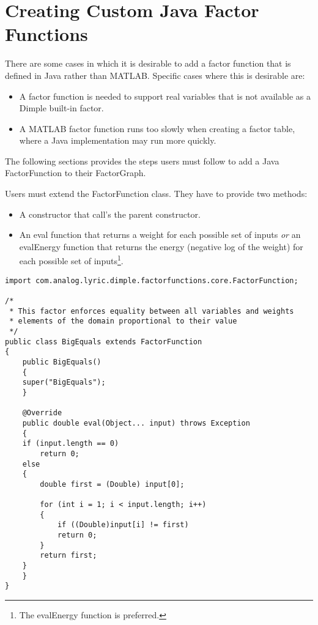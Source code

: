 \section{Creating Custom Java Factor Functions}
\label{sec:userJava}

There are some cases in which it is desirable to add a factor function that is defined in Java rather than MATLAB.  Specific cases where this is desirable are:

\begin{itemize}
\item A factor function is needed to support real variables that is not available as a Dimple built-in factor.
\item A MATLAB factor function runs too slowly when creating a factor table, where a Java implementation may run more quickly.
\end{itemize}

The following sections provides the steps users must follow to add a Java FactorFunction to their FactorGraph.

\label{sec:createJavaFactorFunction}

Users must extend the FactorFunction class. They have to provide two methods:

\begin{itemize}
\item A constructor that call's the parent constructor.
\item An eval function that returns a weight for each possible set of inputs \emph{or} an evalEnergy function that returns the energy (negative log of the weight) for each possible set of inputs\footnote{The evalEnergy function is preferred.}.
\end{itemize}

\begin{lstlisting}
import com.analog.lyric.dimple.factorfunctions.core.FactorFunction;

/*
 * This factor enforces equality between all variables and weights
 * elements of the domain proportional to their value
 */
public class BigEquals extends FactorFunction
{	
    public BigEquals() 
    {
	super("BigEquals");
    }
  
    @Override
    public double eval(Object... input) throws Exception 
    {
	if (input.length == 0)
	    return 0;
	else
	{
	    double first = (Double) input[0];
	    
	    for (int i = 1; i < input.length; i++)
	    {
	        if ((Double)input[i] != first)
		    return 0;
	    }
	    return first;   
	}
    }
}
\end{lstlisting}

